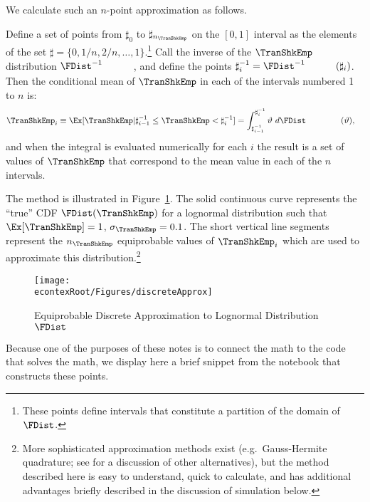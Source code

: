 We calculate such an $n$-point approximation as follows.

Define a set of points from $\sharp_{0}$ to $\sharp_{n_{\TranShkEmp}}$ on the $[0,1]$ interval
as the elements of the set $\sharp = \{0,1/n,2/n, \ldots,1\}$.\footnote{These points define intervals that constitute a partition of the domain of $\FDist$.}  Call the inverse of the $\TranShkEmp$ distribution $\FDist^{-1}_{\phantom{\TranShkEmp}}$, and define the
points $\sharp^{-1}_{i} = \FDist^{-1}_{\phantom{\TranShkEmp}}(\sharp_{i})$.  Then
the conditional mean of $\TranShkEmp$ in each of the intervals numbered 1 to $n$ is:
\begin{equation}\begin{gathered}\begin{aligned}
      \TranShkEmp_{i} \equiv \Ex[\TranShkEmp | \sharp_{i-1}^{-1} \leq \TranShkEmp < \sharp_{i}^{-1}]  & = \int_{\sharp^{-1}_{i-1}}^{\sharp^{-1}_{i}} \vartheta ~ d\FDist_{\phantom{\TranShkEmp}}(\vartheta)  ,
    \end{aligned}\end{gathered}\end{equation}
and when the integral is evaluated numerically for each $i$ the result is a set of values of $\TranShkEmp$ that correspond to the mean value in each of the $n$ intervals.

The method is illustrated in Figure~\ref{fig:discreteapprox}.  The solid continuous curve represents
the ``true'' CDF $\FDist(\TranShkEmp)$ for a lognormal distribution such that $\Ex[\TranShkEmp] = 1$, $\sigma_{\TranShkEmp} = 0.1$.  The short vertical line segments represent the $n_{\TranShkEmp}$
equiprobable values of $\TranShkEmp_{i}$ which are used to approximate this
distribution.\footnote{More sophisticated approximation methods exist
  (e.g.\ Gauss-Hermite quadrature; see \cite{kopecky2010finite} for a discussion of other alternatives), but the method described here is easy to understand, quick to calculate, and has additional advantages briefly described in the discussion of simulation below.}
  \hypertarget{discreteApprox}{}
  \begin{figure}
    \texttt{[image: \\econtexRoot/Figures/discreteApprox]}
    \caption{Equiprobable Discrete Approximation to Lognormal Distribution $\FDist$}
    \label{fig:discreteapprox}
  \end{figure}


Because one of the purposes of these notes is to connect the math to the code that solves the math, we display here a brief snippet from the notebook that constructs these points.


